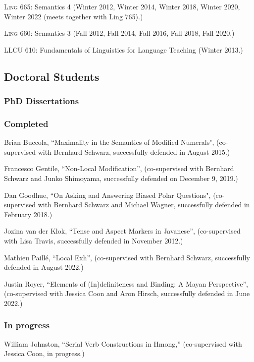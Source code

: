 \documentclass[11pt]{article}
\begin{document}
\textsc{Ling} 665: Semantics 4 (Winter 2012, Winter 2014, Winter 2018, Winter 2020, Winter 2022 (meets together with
Ling 765).)

\textsc{Ling} 660: Semantics 3 (Fall 2012, Fall 2014, Fall 2016, Fall 2018, Fall 2020.)

LLCU 610: Fundamentals of Linguistics for Language Teaching (Winter 2013.)


\subsection*{Doctoral Students}


\subsubsection*{PhD Dissertations}


\subsubsection*{Completed}

Brian Buccola, ``Maximality in the Semantics of Modified Numerals", (co-supervised with Bernhard Schwarz, successfully defended in August 2015.)

Francesco Gentile, ``Non-Local Modification'', (co-supervised with Bernhard Schwarz and Junko Shimoyama, successfully defended on December 9, 2019.)

Dan Goodhue, ``On Asking and Answering Biased Polar Questions", (co-supervised with Bernhard Schwarz and Michael Wagner, successfully defended in February 2018.)

Jozina van der Klok, ``Tense and Aspect Markers in Javanese'',
(co-supervised with Lisa Travis, successfully defended in November
2012.)


Mathieu Paill\'e, ``Local Exh'', (co-supervised with Bernhard Schwarz, successfully defended in August 2022.)

Justin Royer, ``Elements of (In)definiteness and Binding: A Mayan Perspective'', (co-supervised with Jessica Coon and Aron Hirsch, successfully defended in June
2022.)

\vspace{-10pt}

\subsubsection*{In progress}

William Johnston, ``Serial Verb Constructions in Hmong,'' (co-supervised with Jessica Coon, in progress.) 
\end{document}
